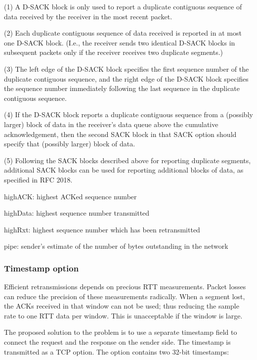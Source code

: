    (1) A D-SACK block is only used to report a duplicate contiguous
   sequence of data received by the receiver in the most recent packet.

   (2) Each duplicate contiguous sequence of data received is reported
   in at most one D-SACK block.  (I.e., the receiver sends two identical
   D-SACK blocks in subsequent packets only if the receiver receives two
   duplicate segments.)

   (3) The left edge of the D-SACK block specifies the first sequence
   number of the duplicate contiguous sequence, and the right edge of
   the D-SACK block specifies the sequence number immediately following
   the last sequence in the duplicate contiguous sequence.

   (4) If the D-SACK block reports a duplicate contiguous sequence from
   a (possibly larger) block of data in the receiver's data queue above
   the cumulative acknowledgement, then the second SACK block in that
   SACK option should specify that (possibly larger) block of data.

   (5) Following the SACK blocks described above for reporting duplicate
   segments, additional SACK blocks can be used for reporting additional
   blocks of data, as specified in RFC 2018.



highACK: highest ACKed sequence number

highData: highest sequence number transmitted

highRxt: highest sequence number which has been retransmitted

pipe: sender's estimate of the number of bytes outstanding in the network

\subsubsection*{Timestamp option}

Efficient retransmissions depends on precious RTT measurements.
Packet losses can reduce the precision of these measurements radically.
When a segment lost, the ACKs received in that window can not be used;
thus reducing the sample rate to one RTT data per window. This is
unacceptable if the window is large.

The proposed solution to the problem is to use a separate timestamp
field to connect the request and the response on the sender side.
The timestamp is transmitted as a TCP option. The option contains two
32-bit timestamps:

